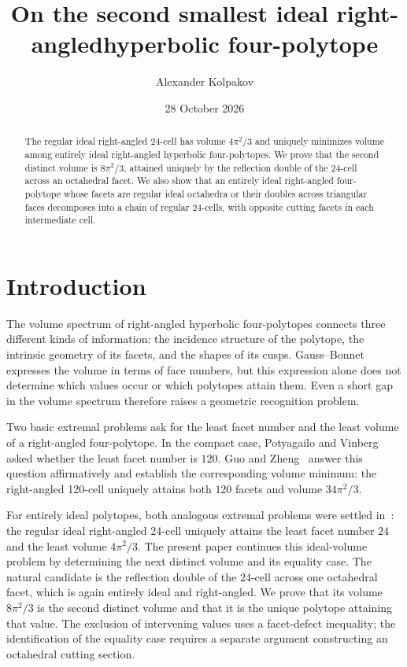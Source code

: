 \documentclass[11pt]{article}
\title{On the second smallest ideal right-angled\linebreak hyperbolic four-polytope}
\author{Alexander Kolpakov}
\date{28 October 2026}
\theoremstyle{remark}
\begin{document}
\nocite{*}
\maketitle
\begin{abstract}
The regular ideal right-angled 24-cell has volume $4\pi^2/3$ and uniquely
minimizes volume among entirely ideal right-angled hyperbolic
four-polytopes. We prove that the second distinct volume is $8\pi^2/3$,
attained uniquely by the reflection double of the 24-cell across an
octahedral facet. We also show that an entirely ideal right-angled
four-polytope whose facets are regular ideal octahedra or their
doubles across triangular faces decomposes
into a chain of regular 24-cells, with opposite cutting facets in each
intermediate cell.
\end{abstract}

\section{Introduction}

The volume spectrum of right-angled hyperbolic four-polytopes connects
three different kinds of information: the incidence structure of the
polytope, the intrinsic geometry of its facets, and the shapes of its
cusps. Gauss--Bonnet expresses the volume in terms of face numbers,
but this expression alone does not determine which values occur or
which polytopes attain them. Even a short gap in the volume spectrum
therefore raises a geometric recognition problem.

Two basic extremal problems ask for the least facet number and the
least volume of a right-angled four-polytope. In the compact case,
Potyagailo and Vinberg~\cite[p.~66]{PV} asked whether the least facet
number is $120$. Guo and Zheng~\cite[Theorem~1.1 and Corollary~1.2]{GuoZheng}
answer this question affirmatively and establish the corresponding
volume minimum: the right-angled 120-cell uniquely attains both
$120$ facets and volume $34\pi^2/3$.

For entirely ideal polytopes, both analogous extremal problems were
settled in~\cite[Theorems~3 and~4]{Kolpakov}: the
regular ideal right-angled 24-cell uniquely attains the least facet
number $24$ and the least volume $4\pi^2/3$. The present paper
continues this ideal-volume problem by determining the next distinct
volume and its equality case. The natural candidate is the reflection
double of the 24-cell across one octahedral facet, which is again
entirely ideal and right-angled. We prove that its volume $8\pi^2/3$
is the second distinct volume and that it is the unique polytope
attaining that value. The exclusion of intervening values uses a
facet-defect inequality; the identification of the equality case
requires a separate argument constructing an octahedral
cutting section.
\end{document}
